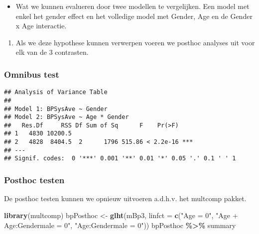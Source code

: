 \documentclass[
  12pt,dutch,coursenotes]{book}
\newenvironment{Shaded}{\begin{snugshade}}{\end{snugshade}}
\newcommand{\DataTypeTok}[1]{\textcolor[rgb]{0.13,0.29,0.53}{#1}}
\newcommand{\DecValTok}[1]{\textcolor[rgb]{0.00,0.00,0.81}{#1}}
\newcommand{\KeywordTok}[1]{\textcolor[rgb]{0.13,0.29,0.53}{\textbf{#1}}}
\newcommand{\NormalTok}[1]{#1}
\newcommand{\OperatorTok}[1]{\textcolor[rgb]{0.81,0.36,0.00}{\textbf{#1}}}
\newcommand{\StringTok}[1]{\textcolor[rgb]{0.31,0.60,0.02}{#1}}
\providecommand{\tightlist}{%
  \setlength{\itemsep}{0pt}\setlength{\parskip}{0pt}}
\theoremstyle{definition}
\theoremstyle{definition}
\theoremstyle{definition}
\theoremstyle{remark}
\begin{document}
\begin{itemize}
\tightlist
\item
  Wat we kunnen evalueren door twee modellen te vergelijken. Een model met enkel het gender effect en het volledige model met Gender, Age en de Gender x Age interactie.
\end{itemize}

\begin{enumerate}
\def\labelenumi{\arabic{enumi}.}
\setcounter{enumi}{1}
\tightlist
\item
  Als we deze hypothese kunnen verwerpen voeren we posthoc analyses uit voor elk van de 3 contrasten.
\end{enumerate}

\hypertarget{omnibus-test}{%
\subsubsection{Omnibus test}\label{omnibus-test}}

\begin{Shaded}
\end{Shaded}

\begin{verbatim}
## Analysis of Variance Table
## 
## Model 1: BPSysAve ~ Gender
## Model 2: BPSysAve ~ Age * Gender
##   Res.Df     RSS Df Sum of Sq      F    Pr(>F)    
## 1   4830 10200.5                                  
## 2   4828  8404.5  2      1796 515.86 < 2.2e-16 ***
## ---
## Signif. codes:  0 '***' 0.001 '**' 0.01 '*' 0.05 '.' 0.1 ' ' 1
\end{verbatim}

\hypertarget{posthoc-testen}{%
\subsubsection{Posthoc testen}\label{posthoc-testen}}

De posthoc testen kunnen we opnieuw uitvoeren a.d.h.v. het multcomp pakket.

\begin{Shaded}
\begin{Highlighting}[]
\KeywordTok{library}\NormalTok{(multcomp)}
\NormalTok{bpPosthoc \textless{}{-}}\StringTok{ }\KeywordTok{glht}\NormalTok{(mBp3, }\DataTypeTok{linfct =} \KeywordTok{c}\NormalTok{(}\StringTok{"Age = 0"}\NormalTok{, }\StringTok{"Age + Age:Gendermale = 0"}\NormalTok{, }
    \StringTok{"Age:Gendermale = 0"}\NormalTok{))}
\NormalTok{bpPosthoc }\OperatorTok{\%\textgreater{}\%}\StringTok{ }\NormalTok{summary}
\end{Highlighting}
\end{Shaded}
\end{document}
